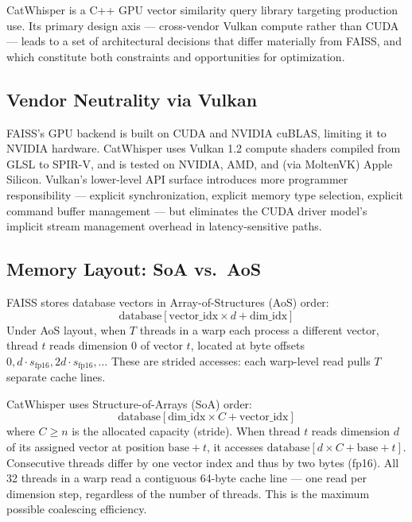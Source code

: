 \documentclass[conference]{IEEEtran}
\begin{document}
CatWhisper is a C++ GPU vector similarity query library targeting
production use.  Its primary design axis --- cross-vendor Vulkan compute
rather than CUDA --- leads to a set of architectural decisions that differ
materially from FAISS, and which constitute both constraints and opportunities
for optimization.

\subsection{Vendor Neutrality via Vulkan}

FAISS's GPU backend is built on CUDA and NVIDIA cuBLAS, limiting it to
NVIDIA hardware.  CatWhisper uses Vulkan 1.2 compute shaders compiled from
GLSL to SPIR-V, and is tested on NVIDIA, AMD, and (via MoltenVK) Apple
Silicon.  Vulkan's lower-level API surface introduces more programmer
responsibility --- explicit synchronization, explicit memory type selection,
explicit command buffer management --- but eliminates the CUDA driver model's
implicit stream management overhead in latency-sensitive paths.

\subsection{Memory Layout: SoA vs.\ AoS}

FAISS stores database vectors in Array-of-Structures (AoS) order:
\begin{equation}
  \text{database}[\text{vector\_idx} \times d + \text{dim\_idx}]
\end{equation}
Under AoS layout, when $T$ threads in a warp each process a different vector,
thread $t$ reads dimension 0 of vector $t$, located at byte offsets
$0, d \cdot s_\text{fp16}, 2d \cdot s_\text{fp16}, \ldots$  These are strided
accesses: each warp-level read pulls $T$ separate cache lines.

CatWhisper uses Structure-of-Arrays (SoA) order:
\begin{equation}
  \text{database}[\text{dim\_idx} \times C + \text{vector\_idx}]
\end{equation}
where $C \geq n$ is the allocated capacity (stride).  When thread $t$ reads
dimension $d$ of its assigned vector at position $\text{base} + t$, it
accesses $\text{database}[d \times C + \text{base} + t]$.  Consecutive
threads differ by one vector index and thus by two bytes (fp16).  All 32
threads in a warp read a contiguous 64-byte cache line --- one read per
dimension step, regardless of the number of threads.  This is the maximum
possible coalescing efficiency.
\end{document}
